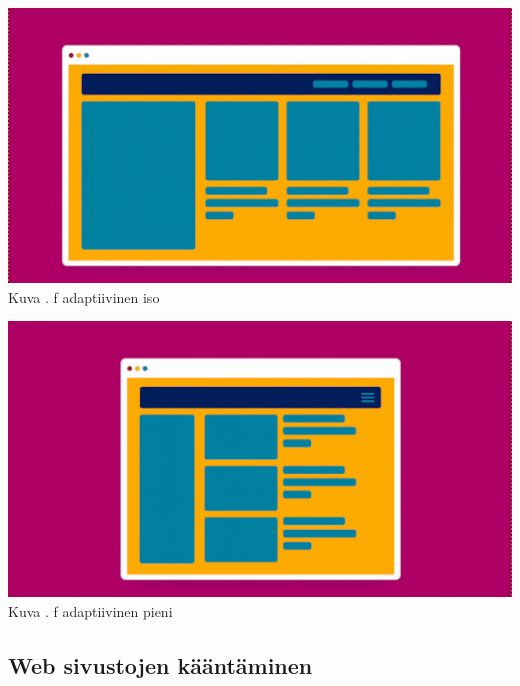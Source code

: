 \documentclass[11pt,a4paper,titlepage,oneside]{article}
\begin{document}
\includegraphics[width = 15cm]{src/public/oppar/adaptiveBig.png}\\
Kuva \getImgCount {}. f adaptiivinen iso\citemissing
 
\bigskip

\includegraphics[width = 15cm]{src/public/oppar/adaptivesmall.png}\\
Kuva \getImgCount {}. f adaptiivinen pieni\citemissing




















\newpage
\subsection{Web sivustojen kääntäminen}

\end{document}
